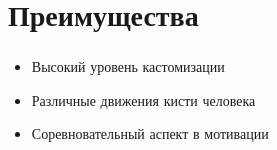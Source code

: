 \section{Преимущества}

\begin{frame}
\frametitle{\insertsection} 
\framesubtitle{\insertsubsection}
    \begin{itemize}
        \item Высокий уровень кастомизации
        \item Различные движения кисти человека
        \item Соревновательный аспект в мотивации
    \end{itemize}
\end{frame}